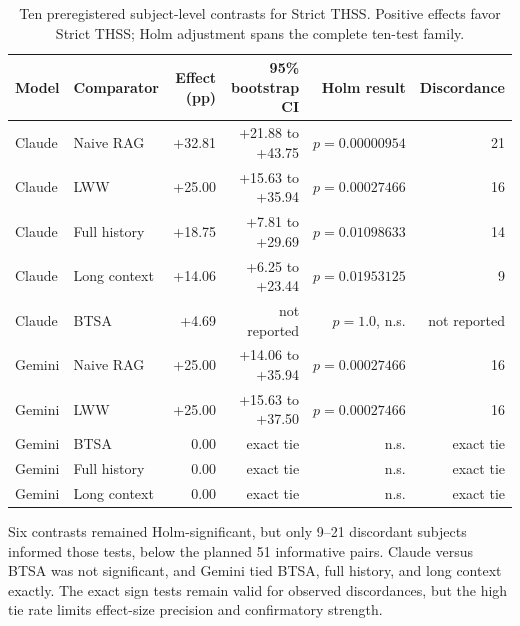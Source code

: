 \documentclass[11pt]{article}
\begin{document}
\begin{table}[H]
\centering
\scriptsize
\caption{Ten preregistered subject-level contrasts for Strict THSS. Positive effects favor Strict THSS; Holm adjustment spans the complete ten-test family.}
\label{tab:models}
\begin{tabular}{llrrrr}
\toprule
\textbf{Model} & \textbf{Comparator} & \textbf{Effect (pp)} & \textbf{95\% bootstrap CI} & \textbf{Holm result} & \textbf{Discordance}\\
\midrule
Claude & Naive RAG & +32.81 & +21.88 to +43.75 & $p=0.00000954$ & 21\\
Claude & LWW & +25.00 & +15.63 to +35.94 & $p=0.00027466$ & 16\\
Claude & Full history & +18.75 & +7.81 to +29.69 & $p=0.01098633$ & 14\\
Claude & Long context & +14.06 & +6.25 to +23.44 & $p=0.01953125$ & 9\\
Claude & BTSA & +4.69 & not reported & $p=1.0$, n.s. & not reported\\
Gemini & Naive RAG & +25.00 & +14.06 to +35.94 & $p=0.00027466$ & 16\\
Gemini & LWW & +25.00 & +15.63 to +37.50 & $p=0.00027466$ & 16\\
Gemini & BTSA & 0.00 & exact tie & n.s. & exact tie\\
Gemini & Full history & 0.00 & exact tie & n.s. & exact tie\\
Gemini & Long context & 0.00 & exact tie & n.s. & exact tie\\
\bottomrule
\end{tabular}
\end{table}

Six contrasts remained Holm-significant, but only 9--21 discordant subjects informed those tests, below the planned 51 informative pairs. Claude versus BTSA was not significant, and Gemini tied BTSA, full history, and long context exactly. The exact sign tests remain valid for observed discordances, but the high tie rate limits effect-size precision and confirmatory strength.
\end{document}
